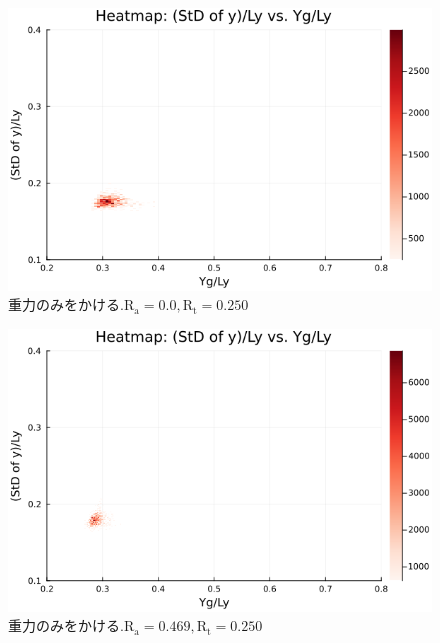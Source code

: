 \begin{figure}[H]
  \centering
  \includegraphics[scale=0.6]{image/dT0_heat/2024-01-15T14:30:47.525_mapg0_chi0_Ay50_rho0.4_T0.43_dT0.0_Rd0.0_Rt0.25_Ra0.0_g0.0003999718779659611_run4.0e7.png}
  \caption{$重力のみをかける. \text{R}_\text{a}=0.0,\text{R}_\text{t}=0.250$}
  \label{}
\end{figure}

\begin{figure}[H]
  \centering
  \includegraphics[scale=0.6]{image/dT0_heat/2024-01-15T14:30:47.592_mapg0_chi0_Ay50_rho0.4_T0.43_dT0.0_Rd0.0_Rt0.25_Ra0.4693845_g0.0003999718779659611_run4.0e7.png}
  \caption{$重力のみをかける. \text{R}_\text{a}=0.469,\text{R}_\text{t}=0.250$}
  \label{}
\end{figure}

